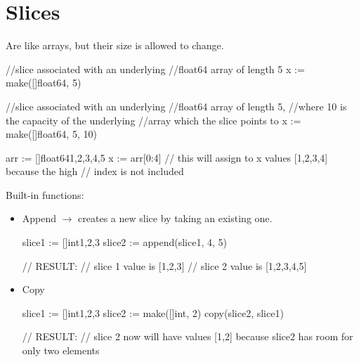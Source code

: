 \documentclass[twoside,a4paper,english]{report}
\begin{document}
\section{Slices}
Are like arrays, but their size is allowed to change.\\
\begin{go}
//slice associated with an underlying
//float64 array of length 5
x := make([]float64, 5)

//slice associated with an underlying
//float64 array of length 5,
//where 10 is the capacity of the underlying
//array which the slice points to
x := make([]float64, 5, 10)

arr := []float64{1,2,3,4,5}
x := arr[0:4] // this will assign to x values [1,2,3,4] because the high 
              // index is not included
\end{go}
Built-in functions:\\
\begin{itemize}
\item Append $\rightarrow$ creates a new slice by taking an existing one.
\begin{go}
slice1 := []int{1,2,3}
slice2 := append(slice1, 4, 5)  

// RESULT:
// slice 1 value is [1,2,3]
// slice 2 value is [1,2,3,4,5]
\end{go} 
\item Copy
\begin{go}
slice1 := []int{1,2,3}
slice2 := make([]int, 2)
copy(slice2, slice1)

// RESULT:
// slice 2 now will have values [1,2] because slice2 has room for only two elements
\end{go}
\end{itemize}
\newpage


\end{document}

